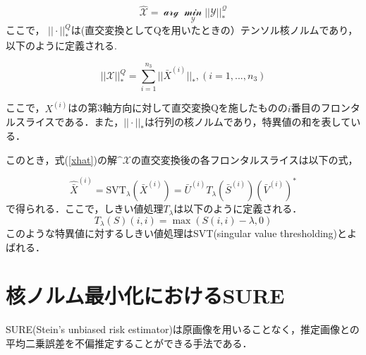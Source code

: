 \begin{equation}
    \label{xhat}
    \hat{\mathcal{X}} = \mathcal{\arg \min_Y||Y||_*^Q}
\end{equation}ここで， $||\cdot||_*^Q$は(直交変換としてQを用いたときの）テンソル核ノルムであり，以下のように定義される.

\begin{equation}
    \label{tnn}
    ||\mathcal{X}||_*^Q =　 \sum_{i=1}^{n_3}||\bar{X}^{(i)}||_*　,　(i=1,...,n_3)
\end{equation}

ここで，$X^{(i)}$はの第3軸方向に対して直交変換Qを施したものの$i$番目のフロンタルスライスである．また，$||\cdot ||_*$は行列の核ノルムであり，特異値の和を表している．

このとき，式(\ref{xhat})の解$\^{\mathcal{X}}$の直交変換後の各フロンタルスライスは以下の式，

\begin{equation}
    \label{eq:yx}
    \hat{\bar{X}}^{(i)} = \mathrm{SVT}_\lambda (\bar{X}^{(i)})= \bar{U}^{(i)} T_\lambda(\bar{S}^{(i)}) (\bar{V}^{(i)})^*
\end{equation}で得られる．ここで，しきい値処理$T_\lambda$は以下のように定義される．
\begin{equation}
    \label{eq:yx}
    T_\lambda(S)(i,i) = \max (S(i,i) -\lambda,0)
\end{equation}
このような特異値に対するしきい値処理はSVT(singular value thresholding)とよばれる．




\section{核ノルム最小化におけるSURE}
SURE(Stein's unbiased risk estimator)は原画像を用いることなく，推定画像との平均二乗誤差を不偏推定することができる手法である．

